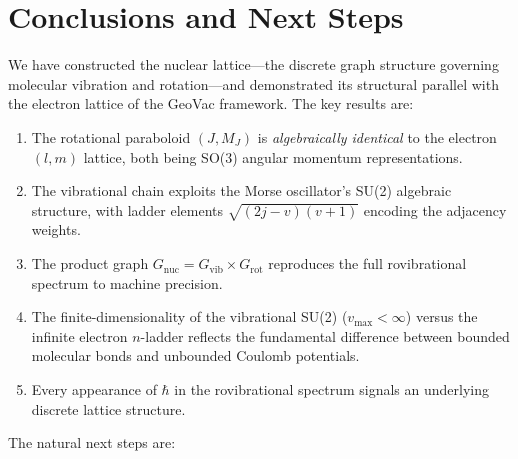 \documentclass[aps,pra,twocolumn,superscriptaddress,longbibliography]{revtex4-2}
\begin{document}
\section{Conclusions and Next Steps}
\label{sec:conclusion}

We have constructed the nuclear lattice---the discrete graph structure
governing molecular vibration and rotation---and demonstrated its
structural parallel with the electron lattice of the GeoVac framework.
The key results are:

\begin{enumerate}
\item The rotational paraboloid $(J, M_J)$ is \emph{algebraically
identical} to the electron $(l, m)$ lattice, both being SO(3) angular
momentum representations.

\item The vibrational chain exploits the Morse oscillator's SU(2)
algebraic structure, with ladder elements
$\sqrt{(2j-v)(v+1)}$ encoding the adjacency weights.

\item The product graph
$G_{\mathrm{nuc}} = G_{\mathrm{vib}} \times G_{\mathrm{rot}}$
reproduces the full rovibrational spectrum to machine precision.

\item The finite-dimensionality of the vibrational SU(2)
($v_{\max} < \infty$) versus the infinite electron $n$-ladder reflects
the fundamental difference between bounded molecular bonds and unbounded
Coulomb potentials.

\item Every appearance of $\hbar$ in the rovibrational spectrum signals
an underlying discrete lattice structure.
\end{enumerate}

The natural next steps are:
\end{document}
